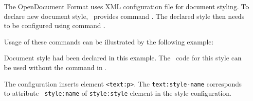 The OpenDocument Format uses XML configuration file for document styling. To
declare new document style, \texfourht\ provides command
\texcommand{\NewConfigureOO}. The declared style then needs to be configured using command \texcommand{\ConfigureOO}.

Usage of these commands can be illustrated by the following example:

\begin{texsource}

\end{texsource}

Document style   had been declared in this example. The
\xml\ code  for this style can be used without the \texcommand{\HCode} command
in \texcommand{\ConfigureOO}.

The configuration  inserts element \verb|<text:p>|. The
\verb|text:style-name| corresponds to attribute \verb| style:name| of
\verb|style:style| element in the style configuration.

